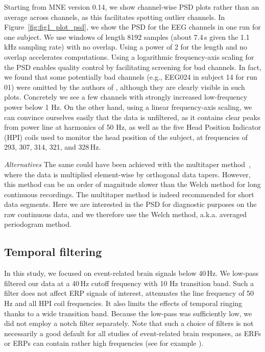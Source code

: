 Starting from MNE version 0.14, we show channel-wise PSD plots rather than an average across channels, as this facilitates spotting outlier channels. In Figure~\ref{fig:fig1_plot_psd}, we show the PSD for the EEG channels in one run for one subject. We use windows of length 8192 samples (about 7.4\,s given the 1.1\,kHz sampling rate) with no overlap. Using a power of 2 for the length and no overlap accelerates computations. Using a logarithmic frequency-axis scaling for the PSD enables quality control by facilitating screening for bad channels. In fact, we found that some potentially bad channels (e.g., EEG024 in subject 14 for run 01) were omitted by the authors of \citep{wakeman2015multi}, although they are clearly visible in such plots. Concretely we see a few channels with strongly increased low-frequency power below 1 Hz. On the other hand, using a linear frequency-axis scaling, we can convince ourselves easily that the data is unfiltered, as it contains clear peaks from power line at harmonics of 50 Hz, as well as the five Head Position Indicator (HPI) coils used to monitor the head position of the subject, at frequencies of 293, 307, 314, 321, and 328\,Hz.

\emph{Alternatives} The same could have been achieved with the multitaper method~\citep{percival1993spectral, slepian1978prolate}, where the data is multiplied element-wise by orthogonal data tapers. However, this method can be an order of magnitude slower than the Welch method for long continuous recordings. The multitaper method is indeed recommended for short data segments. Here we are interested in the PSD for diagnostic purposes on the raw continuous data, and we therefore use the Welch method, a.k.a. averaged periodogram method.

\subsection{Temporal filtering}

In this study, we focused on event-related brain signals below 40\,Hz. We low-pass filtered our data at a 40\,Hz cutoff frequency with 10 Hz transition band. Such a filter does not affect ERP signals of interest, attenuates the line frequency of 50\,Hz and all HPI coil frequencies. It also limits the effects of temporal ringing thanks to a wide transition band. Because the low-pass was sufficiently low, we did not employ a notch filter separately. Note that such a choice of filters is not necessarily a good default for all studies of event-related brain responses, as ERFs or ERPs can contain rather high frequencies (see for example \citep{gotz-etal:15}).

